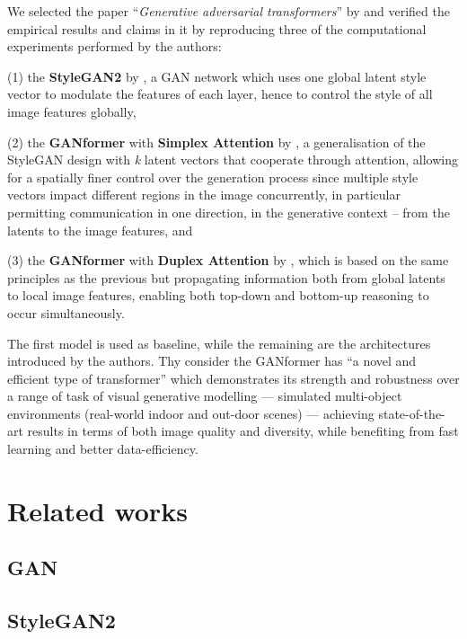 \documentclass{article}
\begin{document}
	We selected the paper ``\emph{Generative adversarial transformers}'' by 
	\citet{hudson2021generative} and verified the empirical results and claims in it by reproducing three 
	of the computational experiments performed by the authors:
	\begin{enumerate*}
		\item[(1)] the \textbf{StyleGAN2} by \citet{karras2020analyzing}, a GAN network which uses one 
		global latent style vector to modulate the features of each layer, hence to control the style of all 
		image features globally,
		\item[(2)] the \textbf{GANformer} with \textbf{Simplex Attention} by 
		\citet{hudson2021generative}, a generalisation of the StyleGAN design with \textit{k} latent 
		vectors that cooperate through attention, allowing for a spatially finer control over the generation 
		process since multiple style vectors impact different regions in the image concurrently, in 
		particular permitting communication in one direction, in the generative context – from the latents 
		to the image features, and
		\item[(3)] the \textbf{GANformer} with \textbf{Duplex Attention} by \citet{hudson2021generative}, 
		which is based on the same principles as the previous but propagating information both from 
		global latents to local image features, enabling both top-down and bottom-up reasoning to occur 
		simultaneously.
	\end{enumerate*} 
	
	The first model is used as baseline, while the remaining are the architectures introduced by the 
	authors. Thy consider the GANformer has ``a novel and efficient type of transformer'' which 
	demonstrates its strength and robustness over a range of task of visual generative modelling —  
	simulated multi-object environments (real-world indoor and out-door scenes) — achieving 
	state-of-the-art results in terms of both image quality and diversity, while benefiting from fast 
	learning and better data-efficiency. 
	


	\section{Related works}	
	\subsection{GAN}
	\subsection{StyleGAN2}
\end{document}
